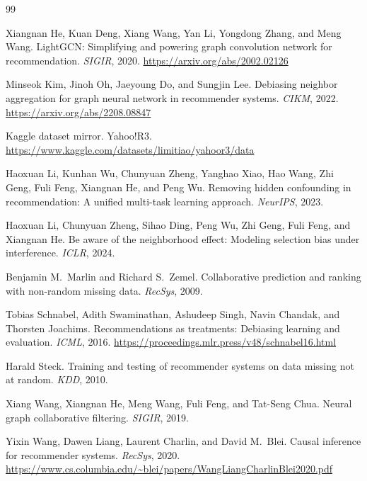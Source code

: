 \clearpage
{\small
\begin{thebibliography}{99}

Xiangnan He, Kuan Deng, Xiang Wang, Yan Li, Yongdong Zhang, and Meng Wang.
\newblock LightGCN: Simplifying and powering graph convolution network for recommendation.
\newblock \emph{SIGIR}, 2020.
\newblock \url{https://arxiv.org/abs/2002.02126}

Minseok Kim, Jinoh Oh, Jaeyoung Do, and Sungjin Lee.
\newblock Debiasing neighbor aggregation for graph neural network in recommender systems.
\newblock \emph{CIKM}, 2022.
\newblock \url{https://arxiv.org/abs/2208.08847}

Kaggle dataset mirror.
\newblock Yahoo!R3.
\newblock \url{https://www.kaggle.com/datasets/limitiao/yahoor3/data}

Haoxuan Li, Kunhan Wu, Chunyuan Zheng, Yanghao Xiao, Hao Wang, Zhi Geng, Fuli Feng, Xiangnan He, and Peng Wu.
\newblock Removing hidden confounding in recommendation: A unified multi-task learning approach.
\newblock \emph{NeurIPS}, 2023.

Haoxuan Li, Chunyuan Zheng, Sihao Ding, Peng Wu, Zhi Geng, Fuli Feng, and Xiangnan He.
\newblock Be aware of the neighborhood effect: Modeling selection bias under interference.
\newblock \emph{ICLR}, 2024.

Benjamin M.\ Marlin and Richard S.\ Zemel.
\newblock Collaborative prediction and ranking with non-random missing data.
\newblock \emph{RecSys}, 2009.

Tobias Schnabel, Adith Swaminathan, Ashudeep Singh, Navin Chandak, and Thorsten Joachims.
\newblock Recommendations as treatments: Debiasing learning and evaluation.
\newblock \emph{ICML}, 2016.
\newblock \url{https://proceedings.mlr.press/v48/schnabel16.html}

Harald Steck.
\newblock Training and testing of recommender systems on data missing not at random.
\newblock \emph{KDD}, 2010.

Xiang Wang, Xiangnan He, Meng Wang, Fuli Feng, and Tat-Seng Chua.
\newblock Neural graph collaborative filtering.
\newblock \emph{SIGIR}, 2019.

Yixin Wang, Dawen Liang, Laurent Charlin, and David M.\ Blei.
\newblock Causal inference for recommender systems.
\newblock \emph{RecSys}, 2020.
\newblock \url{https://www.cs.columbia.edu/~blei/papers/WangLiangCharlinBlei2020.pdf}


\end{thebibliography}}
